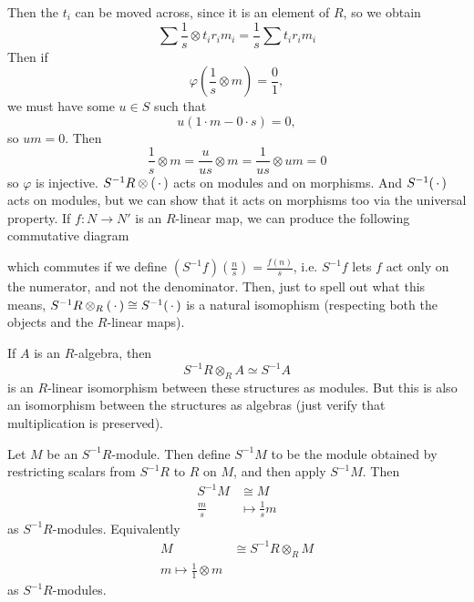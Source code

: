 \documentclass{article}
\begin{document}
Then the $t_{i}$ can be moved across, since it is an element of $R$, so we obtain \[ \sum \frac{1}{s} \otimes t_{i}r_{i}m_{i} = \frac{1}{s} \sum t_{i}r_{i}m_{i} \] Then if \[\varphi\left(\frac{1}{s} \otimes m \right) = \frac{0}{1},\] we must have some $u \in S$ such that \[u(1\cdot m - 0 \cdot s)=0, \] so $um=0$. Then \[ \frac{1}{s} \otimes m = \frac{u}{us} \otimes m = \frac{1}{us} \otimes um = 0\] so $\varphi$ is injective. \gap $S^{-1}R \otimes (\, \cdot \,)$ acts on modules and on morphisms. And $S^{-1}(\, \cdot \,)$ acts on modules, but we can show that it acts on morphisms too via the universal property. \newlec If $f: N \to N'$ is an $R$-linear map, we can produce the following commutative diagram \begin{center}
\end{center}
which commutes if we define $(S^{-1}f)(\frac{n}{s}) = \frac{f(n)}{s}$, i.e. $S^{-1}f$ lets $f$ act only on the numerator, and not the denominator. \gap Then, just to spell out what this means, $S^{-1}R \otimes_{R} (\, \cdot \,) \cong S^{-1}(\, \cdot \,)$ is a natural isomophism (respecting both the objects and the $R$-linear maps).
\begin{remark*}
    If $A$ is an $R$-algebra, then \[ S^{-1}R \otimes_{R} A \simeq S^{-1}A \] is an $R$-linear isomorphism between these structures as modules. But this is also an isomorphism between the structures as algebras (just verify that multiplication is preserved).
\end{remark*}
\begin{fancylem}{}
    Let $M$ be an $S^{-1}R$-module. Then define $S^{-1}M$ to be the module obtained by restricting scalars from $S^{-1}R$ to $R$ on $M$, and then apply $S^{-1}M$. Then 
    \begin{align*} 
        S^{-1}M &\cong M\\
        \frac{m}{s} &\mapsto \frac{1}{s}m
    \end{align*} as $S^{-1}R$-modules. Equivalently 
    \begin{align*}
        M &\cong S^{-1}R \otimes_{R} M\\
        m \mapsto \frac{1}{1} \otimes m
    \end{align*}
    as $S^{-1}R$-modules.
\end{fancylem}
\end{document}
